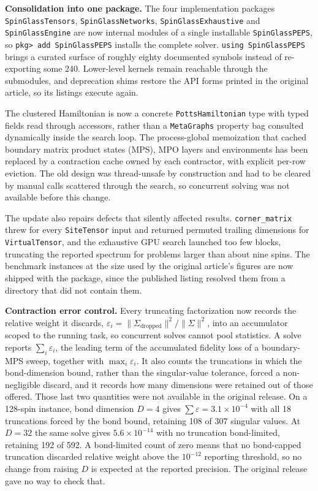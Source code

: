 \documentclass[preprint,12pt,a4paper]{elsarticle}
\begin{document}
\textbf{Consolidation into one package.} The four implementation packages
\texttt{SpinGlassTensors}, \texttt{SpinGlassNetworks},
\texttt{SpinGlassExhaustive} and \texttt{SpinGlassEngine} are now internal modules
of a single installable \texttt{SpinGlassPEPS}, so \texttt{pkg> add SpinGlassPEPS}
installs the complete solver. \texttt{using SpinGlassPEPS} brings a curated surface
of roughly eighty documented symbols instead of re-exporting some 240. Lower-level
kernels remain reachable through the submodules, and deprecation shims restore the
API forms printed in the original article, so its listings execute again.

The clustered Hamiltonian is now a concrete \texttt{PottsHamiltonian} type with
typed fields read through accessors, rather than a \texttt{MetaGraphs} property bag
consulted dynamically inside the search loop. The process-global memoization that
cached boundary matrix product states (MPS), MPO layers and environments has been
replaced by a contraction cache owned by each contractor, with explicit per-row
eviction. The old design was thread-unsafe by construction and had to be cleared by
manual calls scattered through the search, so concurrent solving was not available
before this change.

The update also repairs defects that silently affected results.
\texttt{corner\_matrix} threw for every \texttt{SiteTensor} input and returned
permuted trailing dimensions for \texttt{VirtualTensor}, and the exhaustive GPU
search launched too few blocks,
truncating the reported spectrum for problems larger than about nine spins. The
benchmark instances at the size used by the original article's figures are now
shipped with the package, since the published listing resolved them from a directory
that did not contain them.

\textbf{Contraction error control.} Every truncating factorization now records the
relative weight it discards, $\varepsilon_i =
\lVert\Sigma_{\text{dropped}}\rVert^2/\lVert\Sigma\rVert^2$, into an accumulator
scoped to the running task, so concurrent solves cannot pool statistics. A solve
reports $\sum_i\varepsilon_i$, the leading term of the accumulated fidelity loss of
a boundary-MPS sweep, together with $\max_i\varepsilon_i$. It also counts the
truncations in which the bond-dimension bound, rather than the singular-value
tolerance, forced a non-negligible discard, and it records how many dimensions were
retained out of those offered. Those last two quantities were not available in the
original release. On a 128-spin instance, bond dimension $D=4$ gives
$\sum\varepsilon = 3.1\times10^{-4}$ with all 18 truncations forced by the bond
bound, retaining 108 of 307 singular values. At $D=32$ the same solve gives
$5.6\times10^{-14}$ with no truncation bond-limited, retaining 192 of 592. A
bond-limited count of zero means that no bond-capped truncation discarded relative
weight above the $10^{-12}$ reporting threshold, so no change from raising $D$ is
expected at the reported precision. The original release gave no way to check that.
\end{document}
